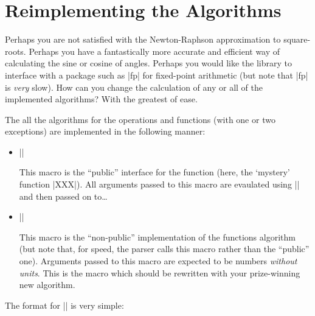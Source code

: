 %
%
%

\section{Reimplementing the Algorithms}

\label{pgfmath-reimplement}

Perhaps you are not satisfied with the Newton-Raphson approximation to
square-roots. Perhaps you have a fantastically more accurate
and efficient way of calculating the sine or cosine of angles. Perhaps
 you would like the library to interface with a package such as |fp| 
 for fixed-point arithmetic (but note that |fp| is \emph{very} slow).
How can you change the calculation of any or all of the implemented
algorithms? With the greatest of ease.

The all the algorithms for the operations and functions (with
one or two exceptions) are implemented in the following manner:

\begin{itemize}
\item |\pgfmathXXX| 

	This macro is the ``public'' interface for the function (here, the
	`mystery' function |XXX|). All arguments passed to this macro are 
	evaulated using |\pgfmathparse| and then passed on to\ldots

\item |\pgfmathXXX@|

	This macro is the ``non-public'' implementation of the functions 
	algorithm (but note that, for speed, the parser calls this macro 
	rather than the ``public'' one). Arguments passed to this macro 
	are expected to be numbers \emph{without units}. This is the macro 
	which should be rewritten with your prize-winning new algorithm.
	
\end{itemize}

The format for |\pgfmathXXX@| is very simple:

\begin{codeexample}
\def\pgfmathXXX@#1#2...{%
   \begingroup%
      ... code for algorithm XXX ...
      \pgfmath@returnone\pgfmath@x%
   \endgroup%
}
\end{codeexample}



